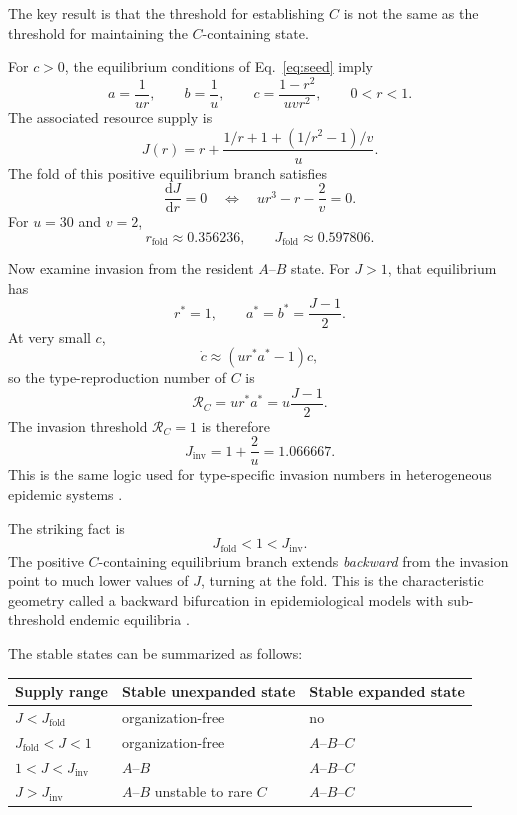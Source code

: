 \documentclass[11pt]{article}
\newcommand{\Rc}{\mathcal R_C}
\newcommand{\dd}{\mathrm d}
\begin{document}
The key result is that the threshold for establishing $C$ is not the same as the threshold for maintaining the $C$-containing state.

For $c>0$, the equilibrium conditions of Eq.~\eqref{eq:seed} imply
\[
a=\frac{1}{ur},
\qquad
b=\frac1u,
\qquad
c=\frac{1-r^2}{uvr^2},
\qquad 0<r<1.
\]
The associated resource supply is
\begin{equation}
J(r)=r+\frac{1/r+1+(1/r^2-1)/v}{u}.
\label{eq:Jr}
\end{equation}
The fold of this positive equilibrium branch satisfies
\[
\frac{\dd J}{\dd r}=0
\quad\Longleftrightarrow\quad
ur^3-r-\frac{2}{v}=0.
\]
For $u=30$ and $v=2$,
\[
r_{\mathrm{fold}}\approx0.356236,
\qquad
J_{\mathrm{fold}}\approx0.597806.
\]

Now examine invasion from the resident $A$--$B$ state. For $J>1$, that equilibrium has
\[
r^*=1,
\qquad
a^*=b^*=\frac{J-1}{2}.
\]
At very small $c$,
\[
\dot c\approx (ur^*a^*-1)c,
\]
so the type-reproduction number of $C$ is
\[
\Rc=ur^*a^*=u\frac{J-1}{2}.
\]
The invasion threshold $\Rc=1$ is therefore
\begin{equation}
J_{\mathrm{inv}}=1+\frac{2}{u}=1.066667.
\label{eq:Jinv}
\end{equation}
This is the same logic used for type-specific invasion numbers in heterogeneous epidemic systems \citep{heesterbeek2007}.

The striking fact is
\[
J_{\mathrm{fold}}<1<J_{\mathrm{inv}}.
\]
The positive $C$-containing equilibrium branch extends \emph{backward} from the invasion point to much lower values of $J$, turning at the fold. This is the characteristic geometry called a backward bifurcation in epidemiological models with sub-threshold endemic equilibria \citep{kribs2000,vddwatmough2002}.

The stable states can be summarized as follows:

\begin{center}
\begin{tabular}{lll}
\toprule
Supply range & Stable unexpanded state & Stable expanded state \\
\midrule
$J<J_{\mathrm{fold}}$ & organization-free & no \\
$J_{\mathrm{fold}}<J<1$ & organization-free & $A$--$B$--$C$ \\
$1<J<J_{\mathrm{inv}}$ & $A$--$B$ & $A$--$B$--$C$ \\
$J>J_{\mathrm{inv}}$ & $A$--$B$ unstable to rare $C$ & $A$--$B$--$C$ \\
\bottomrule
\end{tabular}
\end{center}
\end{document}
